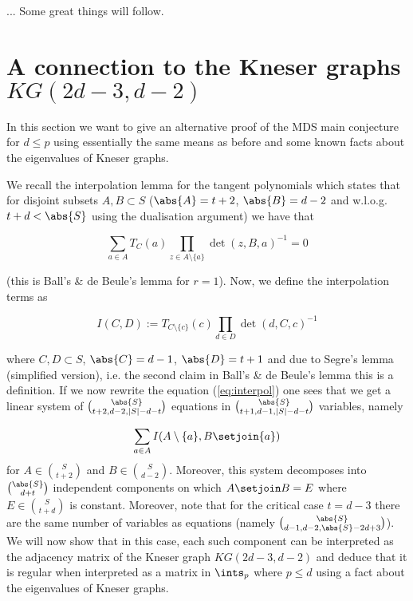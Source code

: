 \message{ !name(OnTheRAIDProblem.tex)}\documentclass[8pt,a4paper]{article}
\begin{document}
... Some great things will follow.

\section{A connection to the Kneser graphs $KG(2d-3,d-2)$}

In this section we want to give an alternative proof of the MDS main conjecture for $d\leq p$ using essentially the same means as before and some known facts about the eigenvalues of Kneser graphs.

We recall the interpolation lemma for the tangent polynomials which states that for disjoint subsets $A,B\subset S$ ($\abs{A}=t+2$, $\abs{B}=d-2$ and w.l.o.g. $t+d < \abs{S}$ using the dualisation argument)
we have that

\begin{equation}
\sum_{a\in A}{T_C(a)\prod_{z\in A\setminus \{a\}}\det(z,B,a)^{-1}}=0\label{eq:interpol}
\end{equation}

(this is Ball's \& de Beule's lemma for $r=1$). Now, we define the interpolation terms as

\begin{equation}
I(C,D):=T_{C\setminus\{c\}}(c)\prod_{d\in D}\det(d,C,c)^{-1}
\end{equation}

where $C,D\subset S$, $\abs{C}=d-1$, $\abs{D}=t+1$ and due to Segre's lemma (simplified version), i.e. the second claim in Ball's \& de Beule's lemma this is a definition.
If we now rewrite the equation (\ref{eq:interpol}) one sees that we get a linear system of $\binom{\abs{S}}{t+2,d-2,|S|-d-t}$ equations in $\binom{\abs{S}}{t+1,d-1,|S|-d-t}$ variables, namely

\begin{equation}
\sum_{a\in A}{I(A\setminus\{a\}, B\setjoin\{a\})}\label{eq:linsys}
\end{equation}
for $A\in\binom{S}{t+2}$ and $B\in\binom{S}{d-2}$. Moreover, this system decomposes into $\binom{\abs{S}}{d+t}$ independent components on which $A\setjoin B=E$ where $E\in\binom{S}{t+d}$ is constant.
Moreover, note that for the critical case $t=d-3$ there are the same number of variables as equations (namely $\binom{\abs{S}}{d-1,d-2,\abs{S}-2d+3}$).
We will now show that in this case, each such component can be interpreted as the adjacency matrix of the Kneser graph $KG(2d-3,d-2)$ and deduce that it is regular when interpreted as a matrix in $\ints_p$ where $p\leq d$ using a fact about the eigenvalues of Kneser graphs.
\end{document}
